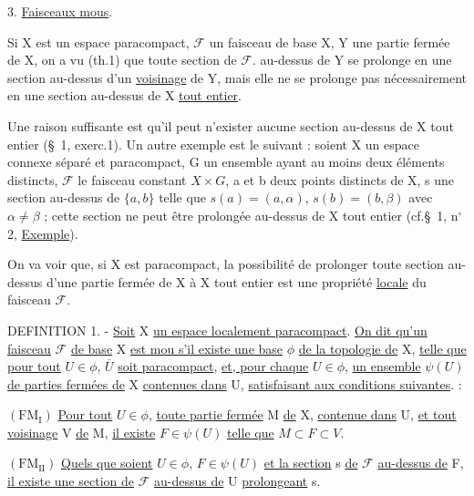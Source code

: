 3. \uline{Faisceaux mous}.

Si X est un espace paracompact, $\mathcal F$ un faisceau de base X, Y une partie fermée de X, on a vu (th.1) que toute section de $\mathcal F$. au-dessus de Y se prolonge en une section au-dessus d'un \uline{voisinage} de Y, mais elle ne se prolonge pas nécessairement en une section au-dessus de X \uline{tout entier}.

Une raison suffisante est qu'il peut n'exister aucune section au-dessus de X tout entier (\S\ 1, exerc.1). Un autre exemple est le suivant : soient X un espace connexe séparé et paracompact, G un ensemble ayant au moins deux éléments distincts, $\mathcal F$ le faisceau constant $X\times G$, a et b deux points distincts de X, s une section au-dessus de $\{a,b\}$ telle que $s(a)=(a,\alpha)$, $s(b)=(b,\beta)$ avec $\alpha\neq\beta$ ; cette section ne peut être prolongée au-dessus de X tout entier (cf.\S\ 1, n$^\circ$ 2, \uline{Exemple}).

On va voir que, si X est paracompact, la possibilité de prolonger toute section au-dessus d'une partie fermée de X à X tout entier est une propriété \uline{locale} du faisceau $\mathcal F$.

DEFINITION 1. - \uline{Soit} X \uline{un espace localement paracompact}. \uline{On dit qu'un faisceau} $\mathcal F$ \uline{de base} X \uline{est mou s'il existe une base} $\phi$ \uline{de la topologie de} X, \uline{telle que pour tout} $U\in\phi$, $\overline U$ \uline{soit paracompact}, \uline{et, pour chaque} $U\in\phi$, \uline{un ensemble} $\psi(U)$ \uline{de parties fermées de} X \uline{contenues dans} U, \uline{satisfaisant aux conditions suivantes}. :

$(\mathrm{FM}_{\mathrm I})$ \uline{Pour tout} $U\in\phi$, \uline{toute partie fermée} M \uline{de} X, \uline{contenue dans} U, \uline{et tout voisinage} V \uline{de} M, \uline{il existe} $F\in\psi(U)$ \uline{telle que} $M\subset F\subset V$.

$(\mathrm{FM}_{\mathrm{II}})$ \uline{Quels que soient} $U\in\phi$, $F\in\psi(U)$ \uline{et la section} s \uline{de} $\mathcal F$ \uline{au-dessus de} F, \uline{il existe une section de} $\mathcal F$ \uline{au-dessus de} U \uline{prolongeant} s.

